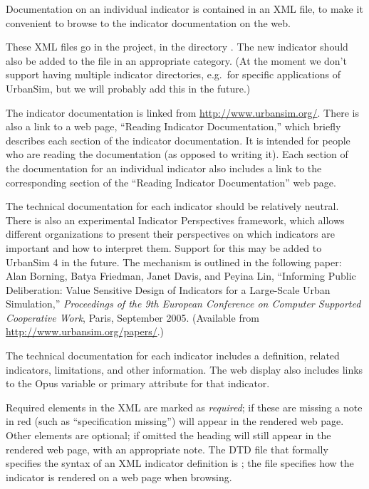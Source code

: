 Documentation on an individual indicator is contained in an XML file, to
make it convenient to browse to the indicator documentation on the web.

These XML files go in the  project, in the directory
.  The new indicator should also be added
to the  file in an appropriate category.
(At the moment we don't support having multiple indicator directories,
e.g.\ for specific applications of UrbanSim, but we will probably add this
in the future.)

The indicator documentation is
linked from \url{http://www.urbansim.org/}.  There is also a link
to a web page, ``Reading Indicator Documentation,'' which briefly describes
each section of the indicator documentation.  It is intended for people who
are reading the documentation (as opposed to writing it).
Each section of the documentation for an individual indicator
also includes a link to the corresponding section of the ``Reading
Indicator Documentation'' web page.

The technical documentation for each indicator should be relatively neutral.  There is also
an experimental Indicator Perspectives framework, which allows different organizations
to present their perspectives on which indicators are important and how to interpret
them.  Support for this may be added to UrbanSim 4 in the future.  The mechanism is
outlined in the following paper:
Alan Borning, Batya Friedman, Janet Davis, and Peyina Lin,
``Informing Public Deliberation: Value Sensitive Design of Indicators for a
Large-Scale Urban Simulation,'' \emph{Proceedings of the 9th European
Conference on Computer Supported Cooperative Work}, Paris, September 2005.  (Available
from \url{http://www.urbansim.org/papers/}.)

The technical documentation for each indicator includes a definition,
related indicators, limitations, and other information.  The web display
also includes links to the Opus variable or primary attribute for that
indicator.

Required elements in the XML are marked as \emph{required}; if these
are missing a note in red (such as ``specification missing'') will
appear in the rendered web page. Other elements are optional; if
omitted the heading will still appear in the rendered web page, with
an appropriate note. The DTD file that formally specifies the syntax
of an XML indicator definition is ;
the file  specifies how the indicator is
rendered on a web page when browsing.


